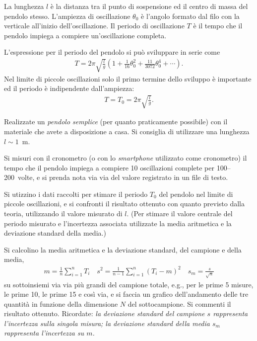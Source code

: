 \documentclass{lab1-article}
\begin{document}
\begin{article}
La lunghezza $l$ \`e la distanza tra il punto di sospensione ed
il centro di massa del pendolo stesso.
L'ampiezza di oscillazione $\theta_0$ \`e l'angolo formato dal filo con la
verticale all'inizio dell'oscillazione.
Il periodo di oscillazione $T$ \`e il tempo che il pendolo impiega a
compiere un'oscillazione completa.

L'espressione per il periodo del pendolo si pu\`o sviluppare in serie come
\begin{align}\label{eq:periodo_pendolo}
  T = 2\pi\sqrt{\frac{l}{g}} \left( 1 + \frac{1}{16}\theta_0^2 +
  \frac{11}{3072}\theta_0^4 + \cdots \right).
\end{align}
Nel limite di piccole oscillazioni solo il primo termine dello sviluppo
\`e importante ed il periodo \`e indipendente dall'ampiezza:
\begin{align}
  T = T_0 = 2\pi\sqrt{\frac{l}{g}}.
\end{align}


\secmeasurements

Realizzate un \emph{pendolo semplice} (per quanto praticamente possibile) con il
materiale che avete a disposizione a casa. Si consiglia di utilizzare una
lunghezza $l \sim 1$~m.


Si misuri con il cronometro (o con lo \emph{smartphone} utilizzato come cronometro)
il tempo che il pendolo impiega a compiere 10 oscillazioni complete per
100--200~volte, e si prenda nota via via del valore registrato in un file di testo.



Si utizzino i dati raccolti per stimare il periodo $T_0$ del pendolo nel limite
di piccole oscillazioni, e si confronti il risultato ottenuto con quanto
previsto dalla teoria, utilizzando il valore misurato di $l$.
(Per stimare il valore centrale del periodo misurato e l'incertezza associata
utilizzate la media aritmetica e la deviazione standard della media.)

Si calcolino la media aritmetica e la deviazione standard, del campione e della
media,
\begin{align}
  m = \frac{1}{n}\sum_{i=1}^n T_i \quad
  s^2 = \frac{1}{n-1}\sum_{i=1}^n (T_i - m)^2 \quad
  s_m = \frac{s}{\sqrt{n}}
\end{align}
su sottoinsiemi via via pi\`u grandi del campione totale, e.g., per le prime 5
misure, le prime 10, le prime 15 e cos\`i via, e si faccia un grafico
dell'andamento delle tre quantit\`a in funzione della dimensione $N$ del
sottocampione. Si commenti il risultato ottenuto. Ricordate:
\emph{la deviazione standard del campione $s$ rappresenta l'incertezza sulla
singola misura; la deviazione standard della media $s_m$ rappresenta l'incertezza
su $m$.}



\end{article}
\end{document}
